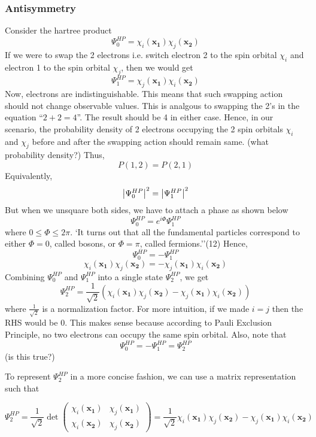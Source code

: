 \documentclass{article}
\begin{document}
      \subsubsection{Antisymmetry}
      Consider the hartree product
      \[\Psi^{H P}_{0} = \chi_i(\mathbf{x_1})\chi_j(\mathbf{x_2})\]
      If we were to swap the 2 electrons i.e. switch electron 2 to the spin
      orbital \(\chi_i\) and electron 1 to the spin orbital \(\chi_j\), then
      we would get
      \[\Psi^{H P}_{1} = \chi_j(\mathbf{x_1})\chi_i(\mathbf{x_2})\]
      Now, electrons are indistinguishable. This means that such swapping action
      should not change observable values. This is analgous to swapping
      the 2's in the equation ``\(2+2=4\)''. The result should be 4 in either
       case. Hence, in our scenario, the probability density of 2 electrons occupying
       the 2 spin orbitals \(\chi_i\) and \(\chi_j\) before and after
       the swapping action should remain same. (what probability density?) Thus,
      \[P(1,2) = P(2,1)\]
      Equivalently,
      \[\abs{\Psi^{H P}_{0}}^2 = \abs{\Psi^{H P}_{1}}^2\]
      But when we unsquare both sides, we have to attach a phase as shown below
      \[\Psi^{H P}_{0} =e^{i\Phi}\Psi^{H P}_{1}\]
      where \(0\leq\Phi\leq2\pi\). `It turns out that all the fundamental particles
      correspond to either \(\Phi=0\), called bosons, or \(\Phi=\pi\),
      called fermions.''(12) Hence,
      \[\Psi^{H P}_{0} = -\Psi^{H P}_{1}\]
      \[\chi_i(\mathbf{x_1})\chi_j(\mathbf{x_2}) = - \chi_j(\mathbf{x_1})\chi_i(\mathbf{x_2})\]
      Combining \(\Psi^{H P}_{0}\) and \(\Psi^{H P}_{1}\) into a single state
      \(\Psi^{H P}_{2}\), we get
      \[\Psi^{H P}_{2} = \frac{1}{\sqrt2}
      (\chi_i(\mathbf{x_1})\chi_j(\mathbf{x_2}) - \chi_j(\mathbf{x_1})\chi_i(\mathbf{x_2}))\]
      where \(\frac{1}{\sqrt2}\) is a normalization factor. For more
      intuition, if we made \(i = j\) then the RHS would be 0. This makes
      sense because according to Pauli Exclusion Principle, no two electrons
      can occupy the same spin orbital. Also, note that
      \[\Psi^{H P}_{0} = -\Psi^{H P}_{1} = \Psi^{H P}_{2}\]
      (is this true?)

      To represent \(\Psi^{H P}_{2}\) in a more concise fashion, we can use
      a matrix representation such that

      \begin{equation*}
        \Psi^{H P}_{2}
        =
        \frac{1}{\sqrt2}
        \det\begin{pmatrix}
        \chi_i(\mathbf{x_1}) & \chi_j(\mathbf{x_1})
        \\
        \chi_i(\mathbf{x_2}) & \chi_j(\mathbf{x_2})
        \end{pmatrix}
        =
        \frac{1}{\sqrt2}
        \chi_i(\mathbf{x_1})\chi_j(\mathbf{x_2}) - \chi_j(\mathbf{x_1})\chi_i(\mathbf{x_2})

      \end{equation*}
\end{document}
